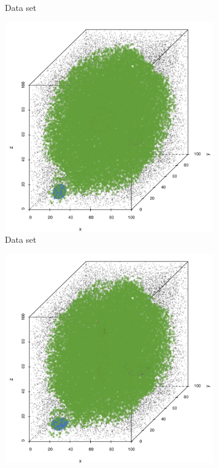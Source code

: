 \begin{figure}
\begin{subfigure}{0.23\textwidth}
				\caption{Data set \baakmanTwo}
				\label{fig:discussion:performance:mbeLowerError:baakman2}
			\end{subfigure}	
			\subfigvspace
			\begin{subfigure}{0.23\textwidth}
				\centering
				\includegraphics[keepaspectratio=true, width=\textwidth, height=0.23\textheight]{discussion/img/ferdosi_3_abs_error_mbeSmallerThansambe}
				\caption{Data set \ferdosiThree}
				\label{fig:discussion:performance:mbeLowerError:ferdosi3}
			\end{subfigure}
			\begin{subfigure}{0.23\textwidth}
				\centering
				\includegraphics[keepaspectratio=true, width=\textwidth, height=0.23\textheight]{discussion/img/baakman_3_abs_error_mbeSmallerThansambe}

\end{subfigure}
\end{figure}
